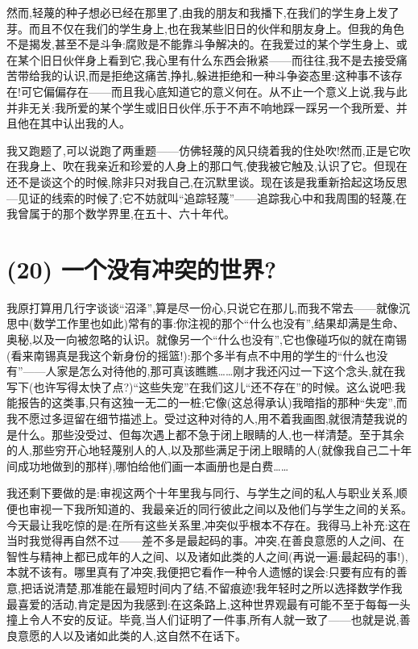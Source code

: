 然而,轻蔑的种子想必已经在那里了,由我的朋友和我播下,在我们的学生身上发了芽。而且不仅在我们的学生身上,也在我某些旧日的伙伴和朋友身上。但我的角色不是揭发,甚至不是斗争:腐败是不能靠斗争解决的。在我爱过的某个学生身上、或在某个旧日伙伴身上看到它,我心里有什么东西会揪紧——而往往,我不是去接受痛苦带给我的认识,而是拒绝这痛苦,挣扎,躲进拒绝和一种斗争姿态里:这种事不该存在!可它偏偏存在——而且我心底知道它的意义何在。从不止一个意义上说,我与此并非无关:我所爱的某个学生或旧日伙伴,乐于不声不响地踩一踩另一个我所爱、并且他在其中认出我的人。

我又跑题了,可以说跑了两重题——仿佛轻蔑的风只绕着我的住处吹!然而,正是它吹在我身上、吹在我亲近和珍爱的人身上的那口气,使我被它触及,认识了它。但现在还不是谈这个的时候,除非只对我自己,在沉默里谈。现在该是我重新拾起这场反思—见证的线索的时候了;它不妨就叫“追踪轻蔑”——追踪我心中和我周围的轻蔑,在我曾属于的那个数学界里,在五十、六十年代。

\section{(20) 一个没有冲突的世界?}

我原打算用几行字谈谈“沼泽”,算是尽一份心,只说它在那儿,而我不常去——就像沉思中(数学工作里也如此)常有的事:你注视的那个“什么也没有”,结果却满是生命、奥秘,以及一向被忽略的认识。就像另一个“什么也没有”,它也像碰巧似的就在南锡(看来南锡真是我这个新身份的摇篮!):那个多半有点不中用的学生的“什么也没有”——人家是怎么对待他的,那可真该瞧瞧……刚才我还闪过一下这个念头,就在我写下(也许写得太快了点?)“这些失宠”在我们这儿“还不存在”的时候。这么说吧:我能报告的这类事,只有这独一无二的一桩;它像(这总得承认)我暗指的那种“失宠”,而我不愿过多逗留在细节描述上。受过这种对待的人,用不着我画图,就很清楚我说的是什么。那些没受过、但每次遇上都不急于闭上眼睛的人,也一样清楚。至于其余的人,那些穷开心地轻蔑别人的人,以及那些满足于闭上眼睛的人(就像我自己二十年间成功地做到的那样),哪怕给他们画一本画册也是白费……

我还剩下要做的是:审视这两个十年里我与同行、与学生之间的私人与职业关系,顺便也审视一下我所知道的、我最亲近的同行彼此之间以及他们与学生之间的关系。今天最让我吃惊的是:在所有这些关系里,冲突似乎根本不存在。我得马上补充:这在当时我觉得再自然不过——差不多是最起码的事。冲突,在善良意愿的人之间、在智性与精神上都已成年的人之间、以及诸如此类的人之间(再说一遍:最起码的事!),本就不该有。哪里真有了冲突,我便把它看作一种令人遗憾的误会:只要有应有的善意,把话说清楚,那准能在最短时间内了结,不留痕迹!我年轻时之所以选择数学作我最喜爱的活动,肯定是因为我感到:在这条路上,这种世界观最有可能不至于每每一头撞上令人不安的反证。毕竟,当人们证明了一件事,所有人就一致了——也就是说,善良意愿的人以及诸如此类的人,这自然不在话下。

